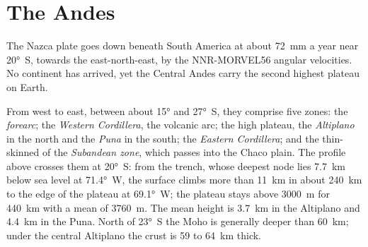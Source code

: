 \section{The Andes}\label{sec:b2:himalaya-andes:andes}

The Nazca plate goes down beneath South America at about \qty{72}{mm} a year near
\ang{20}~S, towards the east-north-east, by the NNR-MORVEL56 angular velocities. No continent
has arrived, yet the Central Andes carry the second highest plateau on Earth.

From west to east, between about \ang{15} and \ang{27}~S, they comprise five zones: the
\emph{forearc}; the \emph{Western Cordillera}, the volcanic arc; the high plateau, the
\emph{Altiplano} in the north and the \emph{Puna} in the south; the \emph{Eastern
Cordillera}; and the thin-skinned  of the \emph{Subandean zone}, which
passes into the Chaco plain. The profile above crosses them at \ang{20}~S: from the trench,
whose deepest node lies \qty{7.7}{km} below sea level at \ang{71.4}~W, the surface climbs
more than \qty{11}{km} in about \qty{240}{km} to the edge of the plateau at \ang{69.1}~W;
the plateau stays above \qty{3000}{m} for \qty{440}{km} with a
mean of \qty{3760}{m}. The mean height is \qty{3.7}{km} in the Altiplano and \qty{4.4}{km} in
the Puna. North of \ang{23}~S the Moho is generally deeper than \qty{60}{km}; under the
central Altiplano the crust is 59 to \qty{64}{km} thick.

